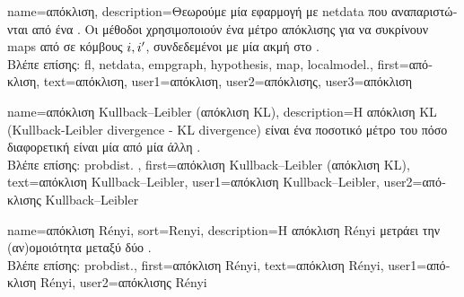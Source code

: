 {name={\foreignlanguage{greek}{απόκλιση}},
	description={\foreignlanguage{greek}{Θεωρούμε μία εφαρμογή} 
		 \foreignlanguage{greek}{με} \gls{netdata} \foreignlanguage{greek}{που αναπαριστώνται από ένα}
		. \foreignlanguage{greek}{Οι μέθοδοι}  \foreignlanguage{greek}{χρησιμοποιούν 
		ένα μέτρο απόκλισης για να συκρίνουν} \gls{map}s  \foreignlanguage{greek}{από}  
		\foreignlanguage{greek}{σε κόμβους} $i,i'$, \foreignlanguage{greek}{συνδεδεμένοι με μία ακμή στο} . \\
		\foreignlanguage{greek}{Βλέπε επίσης:} \gls{fl}, \gls{netdata}, \gls{empgraph}, \gls{hypothesis}, \gls{map}, \gls{localmodel}.},
	first={\foreignlanguage{greek}{απόκλιση}},
	text={\foreignlanguage{greek}{απόκλιση}},
	user1={\foreignlanguage{greek}{απόκλιση}}, %
	user2={\foreignlanguage{greek}{απόκλισης}}, %
	user3={\foreignlanguage{greek}{απόκλιση}} %
}

 {name={\foreignlanguage{greek}{απόκλιση} Kullback–Leibler (\foreignlanguage{greek}{απόκλιση} KL)}, 
 	description={\foreignlanguage{greek}{Η απόκλιση} 
		KL (Kullback-Leibler divergence - KL divergence) \foreignlanguage{greek}{είναι ένα ποσοτικό μέτρο του πόσο διαφορετική 
		είναι μία}  \foreignlanguage{greek}{από μία άλλη} \cite{coverthomas}.\\
		\foreignlanguage{greek}{Βλέπε επίσης:} \gls{probdist}. },
 	first={\foreignlanguage{greek}{απόκλιση} Kullback–Leibler (\foreignlanguage{greek}{απόκλιση} KL)},
	text={\foreignlanguage{greek}{απόκλιση} Kullback–Leibler},
	user1={\foreignlanguage{greek}{απόκλιση} Kullback–Leibler}, %
  	user2={\foreignlanguage{greek}{απόκλισης} Kullback–Leibler} %
}

{name={\foreignlanguage{greek}{απόκλιση} R\'enyi}, 
	sort={Renyi},
	description={\foreignlanguage{greek}{Η απόκλιση} R\'enyi 
		\foreignlanguage{greek}{μετράει την (αν)ομοιότητα μεταξύ δύο}  \cite{RenyiInfo95}.\\
		\foreignlanguage{greek}{Βλέπε επίσης:} \gls{probdist}.}, 
	first={\foreignlanguage{greek}{απόκλιση} R\'enyi},
	text={\foreignlanguage{greek}{απόκλιση} R\'enyi},
	user1={\foreignlanguage{greek}{απόκλιση} R\'enyi}, %
	user2={\foreignlanguage{greek}{απόκλισης} R\'enyi} %
} 

